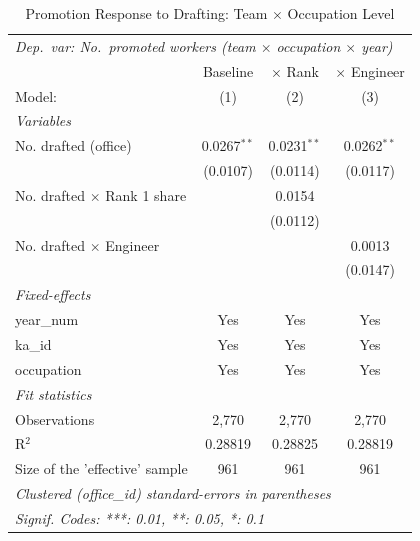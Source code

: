 \begin{table}[htbp]
\centering
\caption{Promotion Response to Drafting: Team $\times$ Occupation Level}
\label{tab:promotion}
\begin{threeparttable}
\begin{tabular}{lccc}
   \tabularnewline \midrule \midrule
\multicolumn{4}{l}{\textit{Dep.\ var: No.\ promoted workers (team $\times$ occupation $\times$ year)}} \\
                                      & Baseline      & $\times$ Rank  & $\times$ Engineer \\    
   Model:                             & (1)           & (2)            & (3)\\  
   \midrule
   \emph{Variables}\\
   No. drafted (office)               & 0.0267$^{**}$ & 0.0231$^{**}$  & 0.0262$^{**}$\\   
                                      & (0.0107)      & (0.0114)       & (0.0117)\\   
   No. drafted $\times$ Rank 1 share  &               & 0.0154         &   \\   
                                      &               & (0.0112)       &   \\   
   No. drafted $\times$ Engineer      &               &                & 0.0013\\   
                                      &               &                & (0.0147)\\   
   \midrule
   \emph{Fixed-effects}\\
   year\_num                          & Yes           & Yes            & Yes\\  
   ka\_id                             & Yes           & Yes            & Yes\\  
   occupation                         & Yes           & Yes            & Yes\\  
   \midrule
   \emph{Fit statistics}\\
   Observations                       & 2,770         & 2,770          & 2,770\\  
   R$^2$                              & 0.28819       & 0.28825        & 0.28819\\  
   Size of the 'effective' sample     & 961           & 961            & 961\\  
   \midrule \midrule
   \multicolumn{4}{l}{\emph{Clustered (office\_id) standard-errors in parentheses}}\\
   \multicolumn{4}{l}{\emph{Signif. Codes: ***: 0.01, **: 0.05, *: 0.1}}\\

\end{tabular}
\end{threeparttable}
\end{table}
